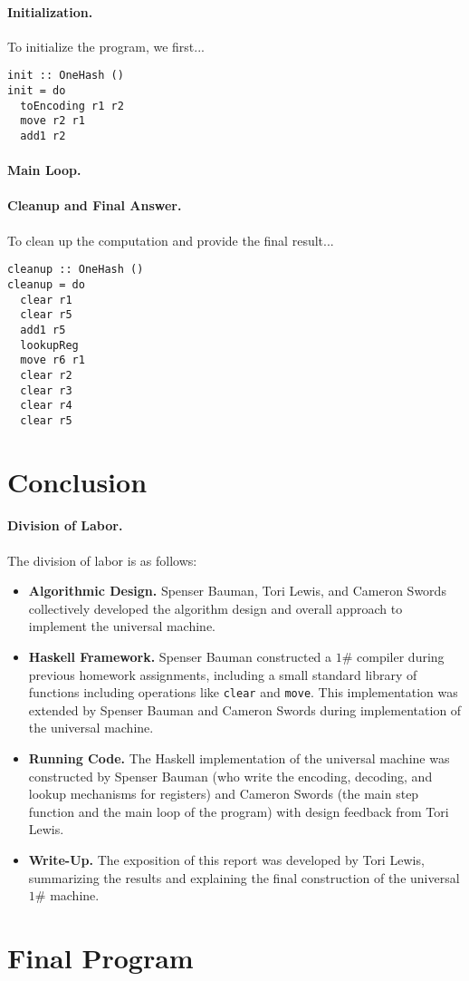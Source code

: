 \documentclass[10pt, preprint, nocopyrightspace]{sigplanconf}
\newcommand{\oh}{$1\#$\xspace}
\begin{document}
\paragraph{Initialization.}

To initialize the program, we first...

\begin{lstlisting}
init :: OneHash ()
init = do
  toEncoding r1 r2
  move r2 r1
  add1 r2
\end{lstlisting}

\paragraph{Main Loop.}

\paragraph{Cleanup and Final Answer.}

To clean up the computation and provide the final result...

\begin{lstlisting}
cleanup :: OneHash ()
cleanup = do
  clear r1
  clear r5
  add1 r5
  lookupReg
  move r6 r1
  clear r2
  clear r3
  clear r4
  clear r5
\end{lstlisting}

\section{Conclusion}

\paragraph{Division of Labor.} The division of labor is as follows:
\begin{itemize}
\item \textbf{Algorithmic Design.} 
      Spenser Bauman, Tori Lewis, and Cameron Swords collectively developed the
      algorithm design and overall approach to implement the universal machine.
\item \textbf{Haskell Framework.}
      Spenser Bauman constructed a \oh compiler during previous homework
      assignments, including a small standard library of functions including
      operations like \lstinline{clear} and \lstinline{move}. This
      implementation was extended by Spenser Bauman and Cameron Swords during
      implementation of the universal machine.
\item \textbf{Running Code.} 
      The Haskell implementation of the universal machine was constructed by
      Spenser Bauman (who write the encoding, decoding, and lookup mechanisms
      for registers) and Cameron Swords (the main step function and the main
      loop of the program) with design feedback from Tori Lewis.
\item \textbf{Write-Up.}
      The exposition of this report was developed by Tori Lewis, summarizing the
      results and explaining the final construction of the universal \oh
      machine. 
\end{itemize}

\clearpage

\appendix

\section{Final Program}


\end{document}
